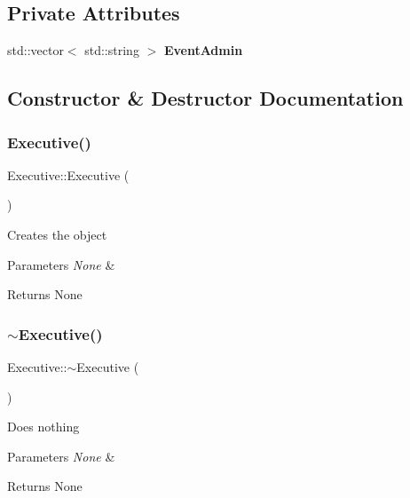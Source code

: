 \subsection*{Private Attributes}
\begin{DoxyCompactItemize}
\item 
\mbox{\label{class_executive_af8e82d8709a378e4409bb8f74e17bebb}} 
std\+::vector$<$ std\+::string $>$ {\bfseries Event\+Admin}
\end{DoxyCompactItemize}


\subsection{Constructor \& Destructor Documentation}
\mbox{\label{class_executive_ad870c1d741f1f313eb0c5a8336f8af6b}} 
\subsubsection{\texorpdfstring{Executive()}{Executive()}}
{\footnotesize\ttfamily Executive\+::\+Executive (\begin{DoxyParamCaption}{ }\end{DoxyParamCaption})}

Creates the object 
\begin{DoxyParams}{Parameters}
{\em None} & \\
\hline
\end{DoxyParams}
\begin{DoxyReturn}{Returns}
None 
\end{DoxyReturn}
\mbox{\label{class_executive_a4ce80c499f7640b1770ade77cf56d965}} 
\subsubsection{\texorpdfstring{$\sim$\+Executive()}{~Executive()}}
{\footnotesize\ttfamily Executive\+::$\sim$\+Executive (\begin{DoxyParamCaption}{ }\end{DoxyParamCaption})}

Does nothing 
\begin{DoxyParams}{Parameters}
{\em None} & \\
\hline
\end{DoxyParams}
\begin{DoxyReturn}{Returns}
None 
\end{DoxyReturn}


